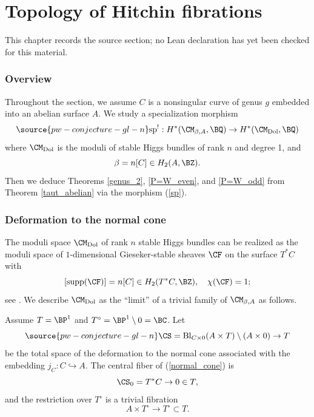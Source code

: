 \chapter{Topology of Hitchin fibrations}
\label{pw-conjecture-gl-n-chapter-07}

\begin{remark}
\label{pw-conjecture-gl-n-chapter-07-source}
This chapter records the source section; no Lean declaration has yet been checked for this material.
\notready
\end{remark}

\subsection{Overview} Throughout the section, we assume $C$ is a nonsingular curve of genus $g$ embedded into an abelian surface $A$. We study a specialization morphism
\begin{equation}\label{sp}
\source{pw-conjecture-gl-n}
    \mathrm{sp}^!: H^*(\CM_{\beta, A}, \BQ) \to H^*(\CM_{\mathrm{Dol}}, \BQ)
\end{equation}
where $\CM_{\mathrm{Dol}}$ is the moduli of stable Higgs bundles of rank $n$ and degree 1, and
\[
\beta = n[C] \in H_2(A, \BZ).
\]
Then we deduce Theorems \ref{genus_2}, \ref{P=W_even}, and \ref{P=W_odd} from Theorem \ref{taut_abelian} via the morphism (\ref{sp}).

\subsection{Deformation to the normal cone}\label{Section 4.2}

The moduli space $\CM_{\mathrm{Dol}}$ of rank $n$ stable Higgs bundles can be realized as the moduli space of $1$-dimensional Gieseker-stable sheaves $\CF$ on the surface $T^*C$ with
\[
 [\mathrm{supp}(\CF)] = n[C] \in H_2(T^*C, \BZ), \quad \chi(\CF) = 1;
\]
see \cite{BNR}. We describe $\CM_{\mathrm{Dol}}$ as the ``limit'' of a trivial family of $\CM_{\beta,A}$ as follows.

Assume $T = \BP^1$ and $T^\circ = \BP^1 \setminus 0 = \BC$. Let
\begin{equation}\label{normal_cone}
\source{pw-conjecture-gl-n}
 \CS = \mathrm{Bl}_{C\times 0}(A \times T) \setminus (A\times 0) \to T
\end{equation}
be the total space of the deformation to the normal cone associated with the embedding $j_C:C\hookrightarrow A$. The central fiber of (\ref{normal_cone}) is
\[
\CS_0 = T^*C \to 0 \in T,
\]
and the restriction over $T^\circ$ is a trivial fibration
\[
A \times T^\circ \to  T^\circ \subset T.
\]


